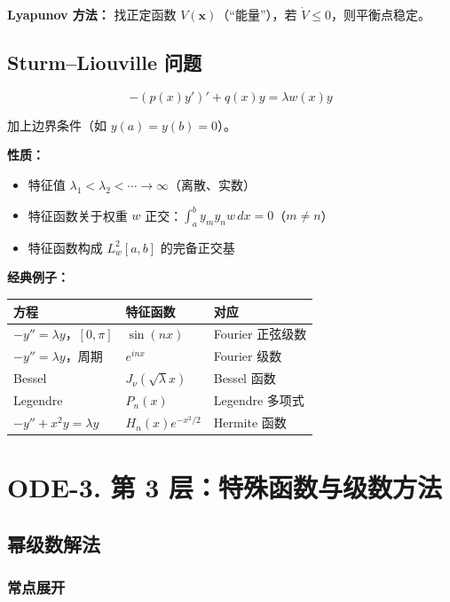 \textbf{Lyapunov 方法：} 找正定函数 $V(\mathbf{x})$（“能量”），若 $\dot{V} \leq 0$，则平衡点稳定。

\subsection{Sturm--Liouville 问题}

\[
-(p(x)y')' + q(x)y = \lambda w(x)y
\]

加上边界条件（如 $y(a) = y(b) = 0$）。

\textbf{性质：}
\begin{itemize}
  \item 特征值 $\lambda_1 < \lambda_2 < \cdots \to \infty$（离散、实数）
  \item 特征函数关于权重 $w$ 正交：$\int_a^b y_m y_n w\,dx = 0$（$m \neq n$）
  \item 特征函数构成 $L^2_w[a,b]$ 的完备正交基
\end{itemize}

\textbf{经典例子：}

\begin{center}
\begin{tabular}{L{4cm}L{3cm}L{4cm}}
\toprule
\textbf{方程} & \textbf{特征函数} & \textbf{对应} \\
\midrule
$-y'' = \lambda y$，$[0,\pi]$ & $\sin(nx)$ & Fourier 正弦级数 \\
$-y'' = \lambda y$，周期 & $e^{inx}$ & Fourier 级数 \\
Bessel & $J_\nu(\sqrt{\lambda}x)$ & Bessel 函数 \\
Legendre & $P_n(x)$ & Legendre 多项式 \\
$-y'' + x^2 y = \lambda y$ & $H_n(x)e^{-x^2/2}$ & Hermite 函数 \\
\bottomrule
\end{tabular}
\end{center}

\section{ODE-3. 第 3 层：特殊函数与级数方法}

\subsection{幂级数解法}

\subsubsection{常点展开}


